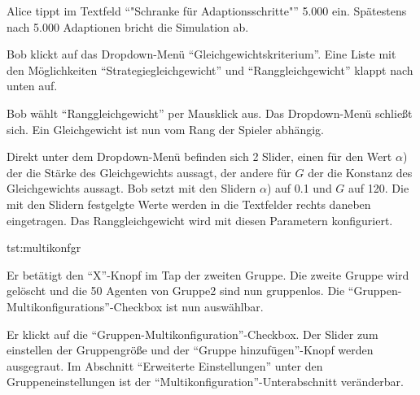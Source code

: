 \documentclass[parskip=full,11pt]{scrartcl}
\begin{document}
{Alice tippt im Textfeld \enquote{"Schranke für Adaptionsschritte"} 5.000 ein.}
{Spätestens nach 5.000 Adaptionen bricht die Simulation ab.}


{Bob klickt auf das Dropdown-Menü \enquote{Gleichgewichtskriterium}.}
{Eine Liste mit den Möglichkeiten \enquote{Strategiegleichgewicht} und  \enquote{Ranggleichgewicht} klappt nach unten auf.}

{Bob wählt \enquote{Ranggleichgewicht} per Mausklick aus.}
{Das Dropdown-Menü schließt sich. Ein Gleichgewicht ist nun vom Rang der Spieler abhängig.}

{Direkt unter dem Dropdown-Menü befinden sich 2 Slider, einen für den Wert \(\alpha\)) der die Stärke des Gleichgewichts aussagt, der andere für \(G\) der die Konstanz des Gleichgewichts aussagt. Bob setzt mit den Slidern \(\alpha\)) auf 0.1 und  \(G\) auf 120.}
{Die mit den Slidern festgelgte Werte werden in die Textfelder rechts daneben eingetragen. Das Ranggleichgewicht wird mit diesen Parametern konfiguriert.}


{tst:multikonfgr}

{Er betätigt den \enquote{X}-Knopf im Tap der zweiten Gruppe.}
{Die zweite Gruppe wird gelöscht und die 50 Agenten von Gruppe2 sind nun gruppenlos. Die \enquote{Gruppen-Multikonfigurations}-Checkbox ist nun auswählbar.}

{Er klickt auf die \enquote{Gruppen-Multikonfiguration}-Checkbox.}
{Der Slider zum einstellen der Gruppengröße und der \enquote{Gruppe hinzufügen}-Knopf werden ausgegraut. Im Abschnitt \enquote{Erweiterte Einstellungen} unter den Gruppeneinstellungen ist der \enquote{Multikonfiguration}-Unterabschnitt veränderbar.}
\end{document}
